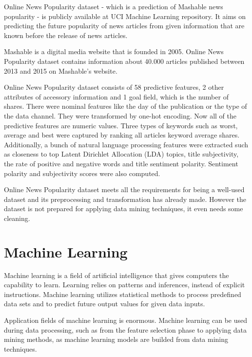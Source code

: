 Online News Popularity dataset \cite{Fernandes2015API} - which is a prediction of Mashable news popularity - is publicly available at UCI Machine Learning repository. It aims on predicting the future popularity of news articles from given information that are known before the release of news articles. \smallskip

Mashable is a digital media website that is founded in 2005. Online News Popularity dataset \cite{Ren2015PredictingAE} contains information about 40.000 articles published between 2013 and 2015 on Mashable's website. \smallskip

Online News Popularity dataset consists of 58 predictive features, 2 other attributes of accessory information and 1 goal field, which is the number of shares. There were nominal features like the day of the publication or the type of the data channel. They were transformed by one-hot encoding. Now all of the predictive features are numeric values. Three types of keywords such as worst, average and best were captured by ranking all articles keyword average shares. Additionally, a bunch of natural language processing features were extracted such as closeness to top Latent Dirichlet Allocation (LDA) topics, title subjectivity, the rate of positive and negative words and title sentiment polarity. Sentiment polarity and subjectivity scores were also computed.\smallskip

Online News Popularity dataset meets all the requirements for being a well-used dataset and its preprocessing and transformation has already made. However the dataset is not prepared for applying data mining techniques, it even needs some cleaning.



\section{Machine Learning}

Machine learning \cite{mitchell1997machine}\cite{michalski2014machine}\cite{alpaydin2009introduction} is a field of artificial intelligence that gives computers the capability to learn. Learning relies on patterns and inferences, instead of explicit instructions. Machine learning utilizes statistical methods to process predefined data sets and to predict future output values for given data inputs. \medskip

Application fields of machine learning is enormous. Machine learning can be used during data processing, such as from the feature selection phase to applying data mining methods, as machine learning models are builded from data mining techniques.  \medskip

